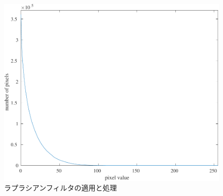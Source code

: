 \begin{figure}[h]
\begin{minipage}[b]{.3\textwidth}
    \end{minipage}
    \begin{minipage}[b]{.3\textwidth}
        \centering
        \includegraphics[keepaspectratio,width=\textwidth]{../../Figures/06_42_Thresholding-graph.pdf}
    \end{minipage}
    \caption{ラプラシアンフィルタの適用と処理}
\end{figure}
